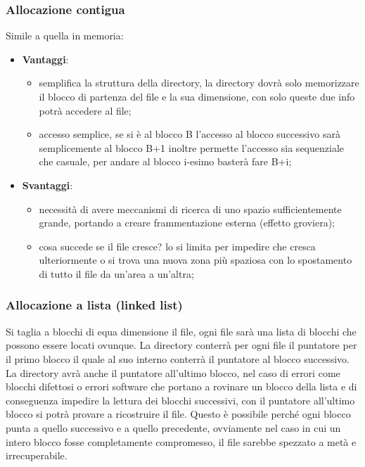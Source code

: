 \documentclass[a4paper, 12pt]{book}
\begin{document}
\subsubsection{Allocazione contigua}

Simile a quella in memoria:
\begin{itemize}
    \item \textbf{Vantaggi}:
    \begin{itemize}
        \item semplifica la struttura della directory, 
        la directory dovrà solo memorizzare il blocco 
        di partenza del file e la sua dimensione, con solo 
        queste due info potrà accedere al file;
        \item accesso semplice, se si è al blocco B l'accesso 
        al blocco successivo sarà semplicemente al blocco B+1
        inoltre permette l'accesso sia sequenziale che casuale, 
        per andare al blocco i-esimo basterà fare B+i;
    \end{itemize}
    \item \textbf{Svantaggi}:
    \begin{itemize}
        \item necessità di avere meccanismi di ricerca di
        uno spazio sufficientemente grande, portando a creare
        frammentazione esterna (effetto groviera);
        \item cosa succede se il file cresce? lo si limita 
        per impedire che cresca ulteriormente o si trova una 
        nuova zona più spaziosa con lo spostamento di tutto 
        il file da un'area a un'altra;
    \end{itemize}
\end{itemize}

\subsubsection{Allocazione a lista (linked list)}

Si taglia a blocchi di equa dimensione il file, ogni 
file sarà una lista di blocchi che possono essere 
locati ovunque. La directory conterrà per ogni file il 
puntatore per il primo blocco il quale al suo interno 
conterrà il puntatore al blocco successivo. La directory
avrà anche il puntatore all'ultimo blocco, nel caso di 
errori come blocchi difettosi o errori software che portano 
a rovinare un blocco della lista e di conseguenza impedire 
la lettura dei blocchi successivi, con il puntatore 
all'ultimo blocco si potrà provare a ricostruire il file.
Questo è possibile perché ogni blocco punta a quello successivo 
e a quello precedente, ovviamente nel caso in cui un intero 
blocco fosse completamente compromesso, il file sarebbe 
spezzato a metà e irrecuperabile. 
\end{document}
